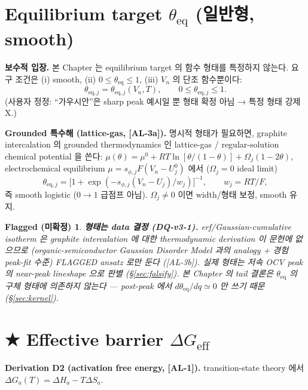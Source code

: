 \documentclass[11pt,a4paper]{article}
\newtheorem*{flagbox}{Flagged (미확정)}
\newcommand{\eff}{\mathrm{eff}}
\newcommand{\eq}{\mathrm{eq}}
\newcommand{\AL}[1]{\textsf{[AL-#1]}}
\begin{document}
\section{Equilibrium target $\theta_\eq$ (일반형, smooth)}\label{sec:equilibrium}
\textbf{보수적 입장.} 본 Chapter 는 equilibrium target 의 함수 형태를 특정하지 않는다.
요구 조건은 (i) smooth, (ii) $0\le\theta_\eq\le1$, (iii) $V_n$ 의 단조 함수뿐이다:
\begin{equation}
\theta_{\eq,j}=\theta_{\eq,j}(V_n,T),\qquad 0\le\theta_{\eq,j}\le1.
\label{eq:thetae}
\end{equation}
(사용자 정정: ``가우시안''은 sharp peak 예시일 뿐 형태 확정 아님 → 특정 형태 강제 X.)

\textbf{Grounded 특수해 (lattice-gas, \AL{3a}).} 명시적 형태가 필요하면, graphite
intercalation 의 grounded thermodynamics 인 lattice-gas / regular-solution chemical
potential \cite{mckinnon1983,bazant2013} 을 쓴다: $\mu(\theta)=\mu^0+RT\ln[\theta/(1-\theta)]
+\Omega_j(1-2\theta)$, electrochemical equilibrium $\mu=s_{\phi,j}F(V_n-U_j^0)$ 에서
($\Omega_j=0$ ideal limit)
\begin{equation}
\theta_{\eq,j}=\big[1+\exp(-s_{\phi,j}(V_n-U_j)/w_j)\big]^{-1},\qquad w_j=RT/F,
\label{eq:latticegas}
\end{equation}
즉 smooth logistic ($0\!\to\!1$ 급점프 아님). $\Omega_j\ne0$ 이면 width/형태 보정, smooth
유지.
\begin{flagbox}
\textbf{형태는 data 결정 (DQ-v3-1).} erf/Gaussian-cumulative isotherm 은 graphite
intercalation 에 대한 thermodynamic derivation 이 문헌에 없으므로 (organic-semiconductor
Gaussian Disorder Model \cite{baessler1993} 과의 analogy + 경험 peak-fit 수준) FLAGGED
ansatz 로만 둔다 (\AL{3b}). 실제 형태는 저속 OCV peak 의 near-peak lineshape 으로 판별
(\S\ref{sec:falsify}). 본 Chapter 의 tail 결론은 $\theta_\eq$ 의 \emph{구체 형태에
의존하지 않는다} — post-peak 에서 $d\theta_\eq/dq\simeq0$ 만 쓰기 때문 (\S\ref{sec:kernel}).
\end{flagbox}

\section{★ Effective barrier $\Delta G_\eff$}\label{sec:barrier}
\textbf{Derivation D2 (activation free energy, \AL{1}).} transition-state theory
\cite{eyring1935,eyringchemrev1935} 에서 $\Delta G_a(T)=\Delta H_a-T\Delta S_a$.
\end{document}
